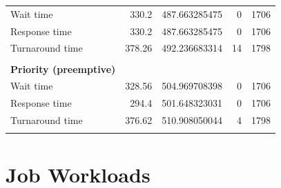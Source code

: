 \documentclass[12pt,letterpaper]{article}
\begin{document}
\begin{appendices}
\begin{table}[H]
\begin{tabular}{l r r r r}
					\hline
					Wait time &		330.2 &	487.663285475 &	0 &	1706 	\\
Response time &		330.2 &	487.663285475 &	0 &	1706 	\\
Turnaround time &	378.26 &	492.236683314 &	14 &	1798 	\\
					\\
					\textbf{Priority (preemptive)} \\
					\hline
					Wait time &		328.56 &	504.969708398 &	0 &	1706	\\
Response time &		294.4 &	501.648323031 &	0 &	1706 	\\
Turnaround time &	376.62 &	510.908050044 &	4 &	1798 	\\
					\\
				\end{tabular}
	 			\label{table:data-rand5}
			\end{table}

	\pagebreak
	\section{Job Workloads}

			\label{table:jim-queue}

	\end{appendices}

	\clearpage
	\printbibliography
\end{document}
